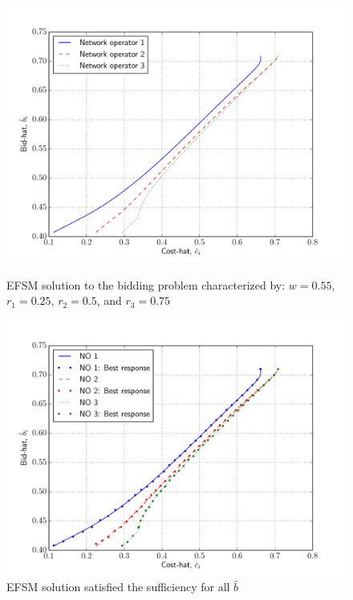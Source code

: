 \begin{figure}[p!]
  \includegraphics[width=\figsize]{Indirect/Figures/efs_3}
  \caption{EFSM solution to the bidding problem characterized by: $w=0.55$, $r_1 = 0.25$, $r_2 = 0.5$, and $r_3 = 0.75$}
  \label{fig:efs_3_indirect}
  \vspace{10mm}
  \includegraphics[width=\figsize]{Indirect/Figures/efs_3_sufficiency}
  \caption{EFSM solution satisfied the sufficiency for all $\hat{b}$}
  \label{fig:efs_3_sufficiency_indirect}
\end{figure}

